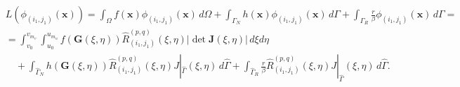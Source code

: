 \documentclass[compress]{beamer}
\begin{document}
\begin{frame}
\begin{definition}
		\vspace{-10pt}
		\begin{align*}
			&L(\phi_{(i_1,j_1)}(\mathbf{x})) = \int_{\Omega}f(\mathbf{x})\phi_{(i_1,j_1)}(\mathbf{x}) \, d\Omega \nonumber + \int_{\Gamma_N}h(\mathbf{x})\phi_{(i_1,j_1)}(\mathbf{x}) \, d\Gamma + \int_{\Gamma_R}\frac{r}{\beta}\phi_{(i_1,j_1)}(\mathbf{x}) \, d\Gamma =\\[5pt]
			&= \int_{v_0}^{v_{m_v}}\int_{u_0}^{u_{m_u}}f(\mathbf{G}(\xi,\eta))\hat{R}_{(i_1,j_1)}^{(p,q)}(\xi,\eta)|\det \mathbf{J}(\xi,\eta)| \, d\xi d\eta \nonumber \\
			&\quad + \int_{\hat{\Gamma}_N} h(\mathbf{G}(\xi,\eta))\hat{R}_{(i_1,j_1)}^{(p,q)}(\xi,\eta) J|_{\hat{\Gamma}}(\xi,\eta) \, d\hat{\Gamma} + \int_{\hat{\Gamma}_R} \frac{r}{\beta}\hat{R}_{(i_1,j_1)}^{(p,q)}(\xi,\eta) J|_{\hat{\Gamma}}(\xi,\eta) \, d\hat{\Gamma}.
		\end{align*}
	\end{definition}
\end{frame}

\end{document}
